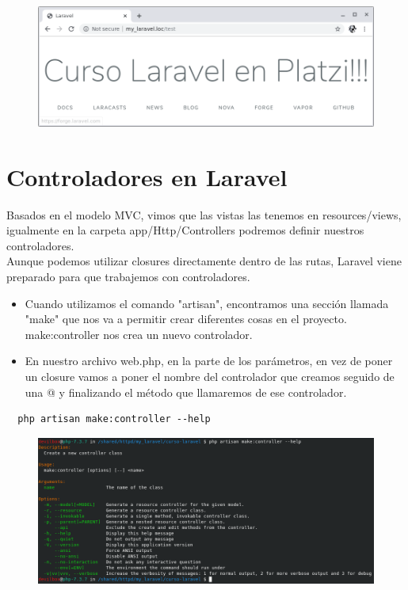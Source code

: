 \documentclass{article}
\begin{document}
\begin{figure}[h!]
  \centering
  \includegraphics[scale=0.5]{./Pictures/009_blade.png}
\end{figure}

\newpage

\section{Controladores en Laravel}%
Basados en el modelo MVC, vimos que las vistas las tenemos en resources/views,
igualmente en la carpeta app/Http/Controllers podremos definir nuestros
controladores.\\
Aunque podemos utilizar closures directamente dentro de las rutas, Laravel
viene preparado para que trabajemos con controladores.\\

\begin{itemize}
  \item Cuando utilizamos el comando "artisan", encontramos una sección llamada
    "make" que nos va a permitir crear diferentes cosas en el proyecto.
    make:controller nos crea un nuevo controlador.
  \item En nuestro archivo web.php, en la parte de los parámetros, en vez de
    poner un closure vamos a poner el nombre del controlador que creamos
    seguido de una @ y finalizando el método que llamaremos de ese controlador.
\end{itemize}

\begin{verbatim}
  php artisan make:controller --help
\end{verbatim}

\begin{figure}[h!]
  \centering
  \includegraphics[scale=0.65]{./Pictures/010_artisan_make_controller.png}
\end{figure}
\end{document}
